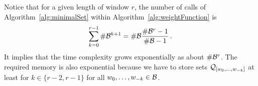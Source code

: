 Notice that for a given length of window $r$, the number of calls of Algorithm~\ref{alg:minimalSet} within Algorithm~\ref{alg:weightFunction} is
$$
\sum_{k=0}^{r-1}  \#\mathcal{B}^{k+1} = \#\mathcal{B} \frac{\#\mathcal{B}^r-1}{\#\mathcal{B}-1}\,.
$$    
It implies that the time complexity grows exponentially as about $\#\mathcal{B}^r$. The required memory is also exponential because we have to store sets $\mathcal{Q}_{[w_{0}, \dots, w_{-k}]}$ at least for $k\in\{r-2, r-1\}$  for all $w_0,\dots, w_{-k} \in \mathcal{B}$.
